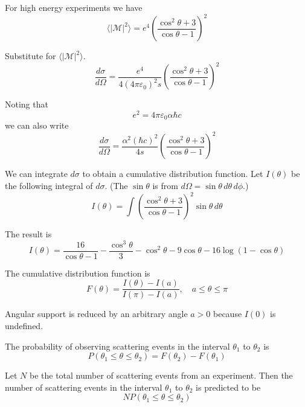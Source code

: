 \documentclass[12pt]{article}
\begin{document}
For high energy experiments we have
\begin{equation*}
\langle|\mathcal{M}|^2\rangle=e^4\left(\frac{\cos^2\theta+3}{\cos\theta-1}\right)^2
\end{equation*}

Substitute for $\langle|\mathcal{M}|^2\rangle$.
\begin{equation*}
\frac{d\sigma}{d\Omega}=\frac{e^4}{4(4\pi\varepsilon_0)^2s}
\left(\frac{\cos^2\theta+3}{\cos\theta-1}\right)^2
\end{equation*}

Noting that
\begin{equation*}
e^2=4\pi\varepsilon_0\alpha\hbar c
\end{equation*}
we can also write
\begin{equation*}
\frac{d\sigma}{d\Omega}
=\frac{\alpha^2(\hbar c)^2}{4s}
\left(\frac{\cos^2\theta+3}{\cos\theta-1}\right)^2
\end{equation*}

We can integrate $d\sigma$ to obtain a cumulative distribution function.
Let $I(\theta)$ be the following integral of $d\sigma$.
(The $\sin\theta$ is from $d\Omega=\sin\theta\,d\theta\,d\phi$.)
\begin{equation*}
I(\theta)=\int
\left(
\frac{\cos^2\theta+3}{\cos\theta-1}
\right)^2
\sin\theta\,d\theta
\end{equation*}


The result is
\begin{equation*}
I(\theta)=\frac{16}{\cos\theta-1}-\frac{\cos^3\theta}{3}-\cos^2\theta-9\cos\theta-16\log(1-\cos\theta)
\end{equation*}

The cumulative distribution function is
\begin{equation*}
F(\theta)=\frac{I(\theta)-I(a)}{I(\pi)-I(a)},
\quad
a\le\theta\le\pi
\end{equation*}

Angular support is reduced by an arbitrary angle $a>0$ because $I(0)$ is undefined.

\bigskip
The probability of observing scattering events in the interval $\theta_1$ to $\theta_2$ is
\begin{equation*}
P(\theta_1\le\theta\le\theta_2)=F(\theta_2)-F(\theta_1)
\end{equation*}

Let $N$ be the total number of scattering events from an experiment.
Then the number of scattering events in the interval $\theta_1$
to $\theta_2$ is predicted to be
$$
NP(\theta_1\le\theta\le\theta_2)
$$
\end{document}
